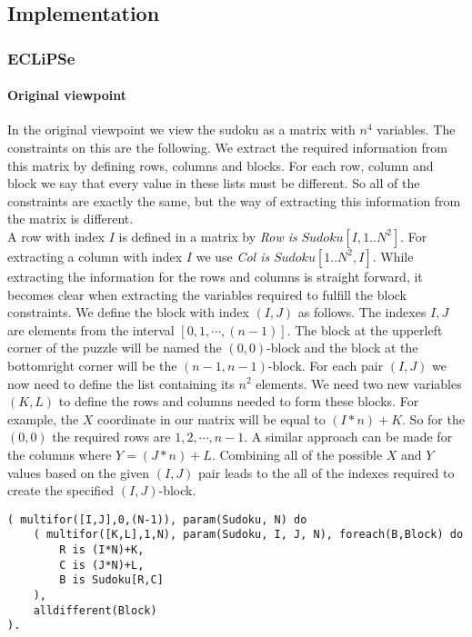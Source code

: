 \subsection{Implementation}
\subsubsection{ECLiPSe}
\paragraph*{Original viewpoint}
In the original viewpoint we view the sudoku as a matrix with $n^{4}$ variables.
The constraints on this are the following.
We extract the required information from this matrix by defining rows, columns and blocks.
For each row, column and block we say that every value in these lists must be different.
So all of the constraints are exactly the same, but the way of extracting this information from the matrix is different.\\

A row with index $I$ is defined in a matrix by \textit{Row is} $Sudoku[I,1..N^{2}]$. 
For extracting a column with index $I$ we use \textit{Col is } $Sudoku[1..N^{2},I]$.
While extracting the information for the rows and columns is straight forward, it becomes clear when extracting the variables required to fulfill the block constraints.
We define the block with index $(I,J)$ as follows. 
The indexes $I, J$ are elements from the interval $[0,1,\cdots,(n-1)]$.
The block at the upperleft corner of the puzzle will be named the $(0,0)$-block and the block at the bottomright corner will be the $(n-1,n-1)$-block.
For each pair $(I,J)$ we now need to define the list containing its $n^{2}$ elements.
We need two new variables $(K,L)$ to define the rows and columns needed to form these blocks.
For example, the $X$ coordinate in our matrix will be equal to $(I*n)+K$. 
So for the $(0,0)$ the required rows are $1,2,\cdots,n-1$.
A similar approach can be made for the columns where $Y = (J*n)+L$.
Combining all of the possible $X$ and $Y$ values based on the given $(I,J)$ pair leads to the all of the indexes required to create the specified $(I,J)$-block.

\begin{lstlisting}
( multifor([I,J],0,(N-1)), param(Sudoku, N) do
	( multifor([K,L],1,N), param(Sudoku, I, J, N), foreach(B,Block) do
		R is (I*N)+K,
		C is (J*N)+L,
		B is Sudoku[R,C]
	),
	alldifferent(Block)
).
\end{lstlisting}

